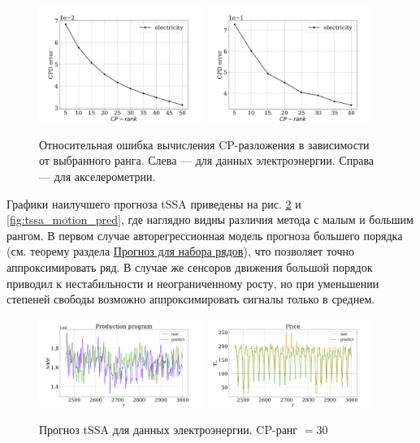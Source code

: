 			\begin{figure}[h]
				\centering
				\includegraphics[width=0.48\textwidth, keepaspectratio]{../experiments/electricity/tssa/figs/CPD_error.png}
				\includegraphics[width=0.48\textwidth, keepaspectratio]{../experiments/motion_1/tssa/figs/CPD_error.png}
				\caption{Относительная ошибка вычисления CP-разложения в зависимости от выбранного ранга. Слева --- для данных электроэнергии. Справа --- для акселерометрии.}\label{fig:cpd_errors}
			\end{figure}
			
			Графики наилучшего прогноза tSSA приведены на рис. \ref{fig:tssa_electr_pred} и \ref{fig:tssa_motion_pred}, где наглядно видны различия метода с малым и большим рангом. В первом случае авторегрессионная модель прогноза большего порядка (см. теорему раздела \hyperref[sec:tssa_forecast]{Прогноз для набора рядов}), что позволяет точно аппроксимировать ряд. В случае же сенсоров движения большой порядок приводил к нестабильности и неограниченному росту, но при уменьшении степеней свободы возможно аппроксимировать сигналы только в среднем.
			
			\begin{figure}[h]
				\centering
				\includegraphics[width=0.48\textwidth, keepaspectratio]{../experiments/electricity/tssa/figs/prediction/cpd_rank_30/Production_program.png}
				\includegraphics[width=0.48\textwidth, keepaspectratio]{../experiments/electricity/tssa/figs/prediction/cpd_rank_30/Price.png}
				\caption{Прогноз tSSA для данных электроэнергии. CP-ранг $ = 30 $}\label{fig:tssa_electr_pred}
			\end{figure}
			
